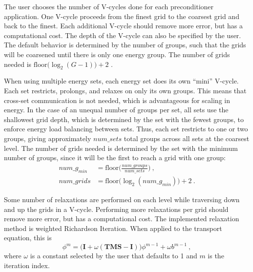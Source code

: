 \documentclass{article}                                                                           %
\newcommand{\ve}[1]{\ensuremath{\mathbf{#1}}}
\begin{document}
The user chooses the number of V-cycles done for each preconditioner application. One V-cycle proceeds from the finest grid to the coarsest grid and back to the finest. Each additional V-cycle should remove more error, but has a computational cost. The depth of the V-cycle can also be specified by the user. The default behavior is determined by the number of groups, such that the grids will be coarsened until there is only one energy group. The number of grids needed is $\text{floor}\bigl( \log_{2}(G-1) \bigr) + 2$ \cite{BinaryTree2012}.%

When using multiple energy sets, each energy set does its own ``mini'' V-cycle. 
Each set restricts, prolongs, and relaxes on only its own groups. 
This means that cross-set communication is not needed, which is advantageous for scaling in energy.
In the case of an unequal number of groups per set, all sets use the shallowest grid depth, which is determined by the set with the fewest groups, to enforce energy load balancing between sets. Thus, each set restricts to one or two groups, giving approximately $num\_sets$ total groups across all sets at the coarsest level. The number of grids needed is determined by the set with the minimum number of groups, since it will be the first to reach a grid with one group:%
\begin{align}
  num\_g_{min} &= \text{floor}\bigl(\frac{num\_groups}{num\_sets}\bigr) \:, \\
  num\_grids &= \text{floor}\bigl( \log_{2}(num\_g_{min}) \bigr) + 2 \:.
  \label{eq:multisetGrids}
\end{align}

Some number of relaxations are performed on each level while traversing down and up the grids in a V-cycle. Performing more relaxations per grid should remove more error, but has a computational cost. The implemented relaxation method is weighted Richardson Iteration. When applied to the transport equation, this is
%
\begin{equation}
  \phi^{m} = \bigr(\ve{I} + \omega(\ve{TMS} - \ve{I})\bigl)\phi^{m-1} + \omega b^{m-1} \:,
  \label{eq:relax}
 \end{equation}
%
where $\omega$ is a constant selected by the user that defaults to 1 and $m$ is the iteration index. 
\end{document}
